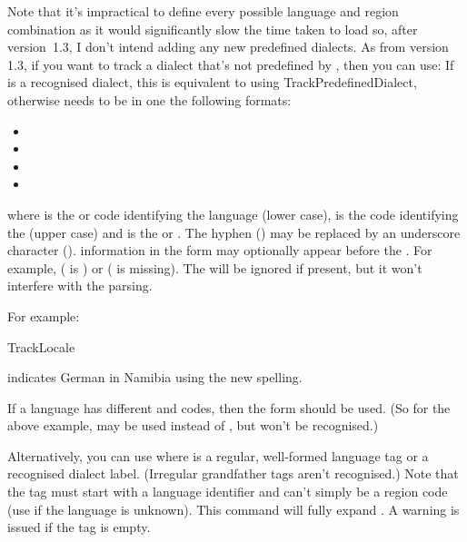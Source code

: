 \documentclass[titlepage=false,oneside,
 fontsize=12pt,captions=tableheading]{scrbook}
\begin{document}
Note that it's impractical to define every possible language
and region combination as it would significantly slow the
time taken to load  so, after version~1.3,
I don't intend adding any new predefined dialects. As from version
1.3, if you want to track a dialect that's not predefined by
, then you can use:
If  is a recognised dialect, this is equivalent to
using \gls{TrackPredefinedDialect}, otherwise 
needs to be in one the following formats:
\begin{itemize}
\item {}
\item {}
\item {}
\item {}
\end{itemize}
where  is the  or  code identifying
the language (lower case),  is the 
 code identifying the  (upper case) and 
 is the  or . The hyphen
() may be replaced by an underscore character 
().  information in the
form  may optionally appear before the
. For example, 
 ( is
) or  ( is missing).
The  will be ignored if present, but it won't interfere
with the parsing.

For example:
\begin{codebox}
\gls{TrackLocale}
\end{codebox}
indicates German in Namibia using the new spelling.

\begin{important}
If a language has different  and  codes, then
the  form should be used. (So for the above example,
 may be used instead of , but 
won't be recognised.)
\end{important}

Alternatively, you can use
where  is a regular, well-formed language tag or a recognised dialect
label. (Irregular grandfather tags aren't recognised.)
Note that the tag must start with a language
identifier and can't simply be a region code (use  if the
language is unknown).
This command will fully expand .
A warning is issued if the tag is empty.
\end{document}
